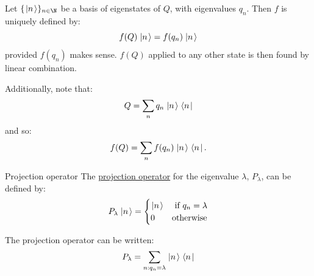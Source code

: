 \documentclass[../Main.tex]{subfiles}
\begin{document}
Let $\{\ket{n}\}_{n \in \N}$ be a basis of eigenstates of $Q$, with eigenvalues $q_n$. Then $f$ is uniquely defined by:
\begin{equation*}
    f(Q)\left.\left|n\right.\right\rangle = f(q_n)\left.\left|n\right.\right\rangle
\end{equation*}
provided $f(q_n)$ makes sense. $f(Q)$ applied to any other state is then found by linear combination.

Additionally, note that:
\begin{equation*}
    Q = \sum_n q_n \left.\left|n\right.\right\rangle\left.\left\langle n\right.\right|
\end{equation*}
and so:
\begin{equation*}
    f(Q) = \sum_n f(q_n) \left.\left|n\right.\right\rangle\left.\left\langle n\right.\right|.
\end{equation*}

\begin{definition}{Projection operator}
    The \underline{projection operator} for the eigenvalue $\lambda$, $P_\lambda$, can be defined by:
    \begin{equation*}
        P_\lambda \left.\left|n\right.\right\rangle =
        \begin{cases}
            \left.\left|n\right.\right\rangle & \text{ if } q_n = \lambda \\
            0 & \text{otherwise}
        \end{cases}
    \end{equation*}
\end{definition}
The projection operator can be written:
\begin{equation*}
    P_\lambda = \sum_{n : q_n = \lambda} \left.\left|n\right.\right\rangle\left.\left\langle n\right.\right|
\end{equation*}
\end{document}
